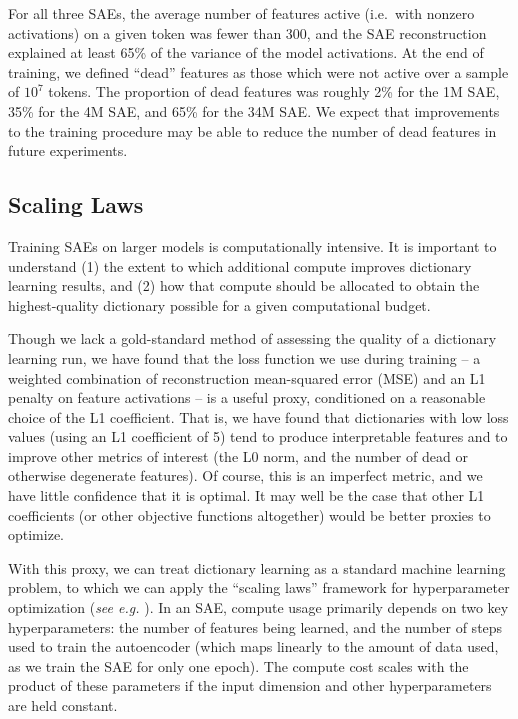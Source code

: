 \documentclass{article}
\let\oldsubsection\subsection
\renewcommand{\subsection}{\FloatBarrier\oldsubsection}
\begin{document}
For all three SAEs, the average number of features active (i.e.~with nonzero activations) on a given token was fewer than 300, and the SAE reconstruction explained at least 65\% of the variance of the model activations. At the end of training, we defined “dead” features as those which were not active over a sample of $10^{7}$ tokens. The proportion of dead features was roughly 2\% for the 1M SAE, 35\% for the 4M SAE, and 65\% for the 34M SAE. We expect that improvements to the training procedure may be able to reduce the number of dead features in future experiments.

\subsection{Scaling Laws}\label{sec:scaling-scaling-laws}

Training SAEs on larger models is computationally intensive. It is important to understand (1) the extent to which additional compute improves dictionary learning results, and (2) how that compute should be allocated to obtain the highest-quality dictionary possible for a given computational budget.

Though we lack a gold-standard method of assessing the quality of a dictionary learning run, we have found that the loss function we use during training -- a weighted combination of reconstruction mean-squared error (MSE) and an L1 penalty on feature activations -- is a useful proxy, conditioned on a reasonable choice of the L1 coefficient. That is, we have found that dictionaries with low loss values (using an L1 coefficient of 5) tend to produce interpretable features and to improve other metrics of interest (the L0 norm, and the number of dead or otherwise degenerate features). Of course, this is an imperfect metric, and we have little confidence that it is optimal. It may well be the case that other L1 coefficients (or other objective functions altogether) would be better proxies to optimize.

With this proxy, we can treat dictionary learning as a standard machine learning problem, to which we can apply the “scaling laws” framework for hyperparameter optimization (\textit{see e.g.} \cite{kaplan2020scaling,hoffmann2022training}). In an SAE, compute usage primarily depends on two key hyperparameters: the number of features being learned, and the number of steps used to train the autoencoder (which maps linearly to the amount of data used, as we train the SAE for only one epoch). The compute cost scales with the product of these parameters if the input dimension and other hyperparameters are held constant.
\end{document}
